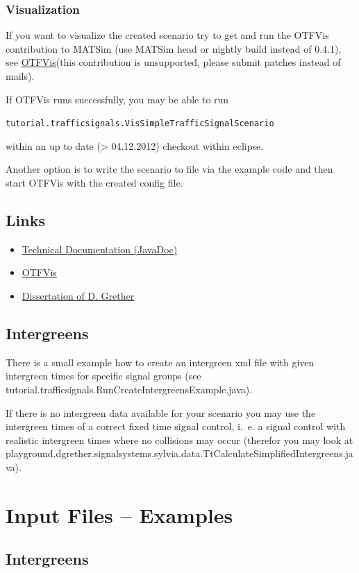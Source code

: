 \subsubsection{Visualization}

If you want to visualize the created scenario try to get and run the OTFVis contribution to MATSim (use MATSim head or nightly build instead of 0.4.1), see \href{http://matsim.org/docs/extensions/otfvis}{OTFVis}(this contribution is unsupported, please submit patches instead of mails).

If OTFVis runs successfully, you may be able to run


\texttt{\nolinebreak  tutorial.trafficsignals.VisSimpleTrafficSignalScenario }

within an up to date (> 04.12.2012) checkout within eclipse.

Another option is to write the scenario to file via the example code and then start OTFVis with the created config file.

\subsection{Links}
\begin{itemize}
	\item \href{http://ci.matsim.org:8080/job/MATSim_M2/javadoc/org/matsim/signalsystems/package-summary.html}{Technical Documentation (JavaDoc)}
	\item \href{http://matsim.org/node/693}{OTFVis}
	\item \href{https://opus4.kobv.de/opus4-tuberlin/frontdoor/index/index/docId/5325}{Dissertation of D. Grether}	
\end{itemize}

\subsection{Intergreens}

There is a small example how to create an intergreen xml file with given
intergreen times for specific signal groups (see
tutorial.trafficsignals.RunCreateIntergreensExample.java).

If there is no intergreen data available for your scenario you may use the
intergreen times of a correct fixed time signal control, i.~e. a signal control
with realistic intergreen times where no collisions may occur (therefor you may
look at playground.dgrether.signalsystems.sylvia.data.TtCalculateSimplifiedIntergreens.java).

\section{Input Files -- Examples}

\subsection{Intergreens}
\lstset{breaklines=true,language=XML}



\texttt{\nolinebreak  }




\texttt{\nolinebreak  }
